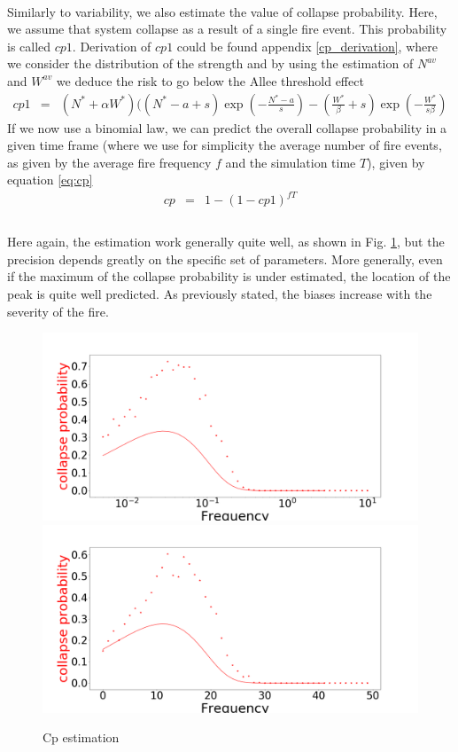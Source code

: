 \documentclass{article}
\begin{document}
\paragraph{}
Similarly to variability, we also estimate the value of collapse probability. Here, we assume that system collapse as a result of a single fire event. This probability is called $cp1$. Derivation of $cp1$ could be found appendix \ref{cp_derivation}, where we consider the distribution of the strength and by using the estimation of $N^{av}$ and $W^{av}$ we deduce the risk to go below the Allee threshold effect
\[
\begin{array}{rcl}
cp1 & = & (N^*+\alpha W^*)((N^*-a+s)\exp(-\frac{N^*-a}{s}) - (\frac{W^*}{\beta}+s)\exp(-\frac{W^*}{s\beta})
\end{array}
\]
If we now use a binomial law, we can predict the overall collapse probability in a given time frame (where we use for simplicity the average number of fire events, as given by the average fire frequency $f$ and the simulation time $T$), given by equation \ref{eq:cp}
\begin{equation} \label{eq:cp}
\begin{array}{rcl}
cp & = & 1-(1-cp1)^{fT} \\
\end{array}
\end{equation}

\paragraph{}
Here again, the estimation work generally quite well, as shown in Fig. \ref{fig:CPE}, but the precision depends greatly on the specific set of parameters.
More generally, even if the maximum of the collapse probability is under estimated, the location of the peak is quite well predicted. As previously stated, the biases increase with the severity of the fire.

\begin{figure}[h!]
\centering
\includegraphics[width=6.cm]{cp_good.png}
\includegraphics[width=6.cm]{cp_bad.png}
\caption{Cp estimation
\label{fig:CPE}
}
\end{figure}
\end{document}
